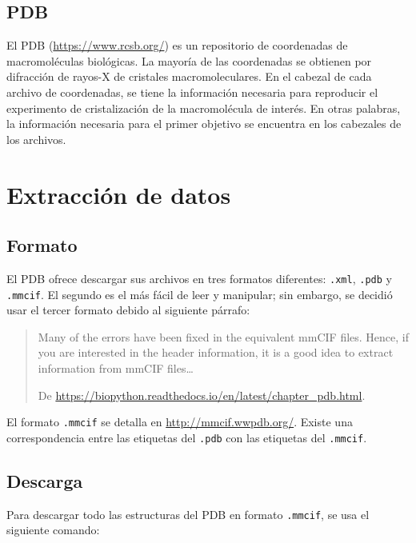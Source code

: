 \documentclass[
]{book}
\theoremstyle{definition}
\theoremstyle{definition}
\theoremstyle{definition}
\theoremstyle{definition}
\theoremstyle{remark}
\begin{document}
\hypertarget{pdb}{%
\section{PDB}\label{pdb}}

El PDB (\url{https://www.rcsb.org/}) es un repositorio de coordenadas de macromoléculas biológicas. La mayoría de las coordenadas se obtienen por difracción de rayos-X de cristales macromoleculares. En el cabezal de cada archivo de coordenadas, se tiene la información necesaria para reproducir el experimento de cristalización de la macromolécula de interés. En otras palabras, la información necesaria para el primer objetivo se encuentra en los cabezales de los archivos.

\hypertarget{extracciuxf3n-de-datos}{%
\chapter{Extracción de datos}\label{extracciuxf3n-de-datos}}

\hypertarget{formato}{%
\section{Formato}\label{formato}}

El PDB ofrece descargar sus archivos en tres formatos diferentes: \texttt{.xml}, \texttt{.pdb} y \texttt{.mmcif}. El segundo es el más fácil de leer y manipular; sin embargo, se decidió usar el tercer formato debido al siguiente párrafo:

\begin{quote}
Many of the errors have been fixed in the equivalent mmCIF files. Hence, if you are interested in the header information, it is a good idea to extract information from mmCIF files\ldots{}

De \url{https://biopython.readthedocs.io/en/latest/chapter_pdb.html}.
\end{quote}

El formato \texttt{.mmcif} se detalla en \url{http://mmcif.wwpdb.org/}. Existe una correspondencia entre las etiquetas del \texttt{.pdb} con las etiquetas del \texttt{.mmcif}.

\hypertarget{descarga}{%
\section{Descarga}\label{descarga}}

Para descargar todo las estructuras del PDB en formato \texttt{.mmcif}, se usa el siguiente comando:
\end{document}
